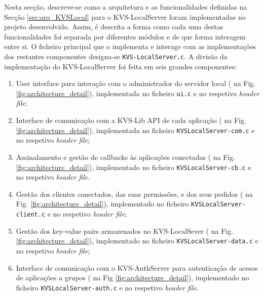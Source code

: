 Nesta secção, descreve-se como a arquitetura e as funcionalidades definidas na Secção \ref{sec:arq_KVSLocal} para o KVS-LocalServer foram implementadas no projeto desenvolvido. Assim, é descrita a forma como cada uma destas funcionalidades foi separada por diferentes módulos e de que forma interagem entre si. O ficheiro principal que o implementa e interage com as implementações dos restantes componentes designa-se \texttt{KVS-LocalServer.c}. A divisão da implementação do KVS-LocalServer foi feita em seis grandes componentes:
\begin{enumerate}[noitemsep]
    \item User interface para interação com o administrador do servidor local ( na Fig. \ref{fig:architecture_detail}), implementada no ficheiro \texttt{ui.c} e no respetivo \textit{header file};
    \item Interface de comunicação com a KVS-Lib API de cada aplicação ( na Fig. \ref{fig:architecture_detail}), implementada no ficheiro \texttt{KVSLocalServer-com.c} e no respetivo \textit{header file};
    \item Assinalamento e gestão de callbacks às aplicações conectadas ( na Fig. \ref{fig:architecture_detail}), implementado no ficheiro \texttt{KVSLocalServer-cb.c} e no respetivo \textit{header file}.
    \item Gestão dos clientes conectados, das suas permissões, e dos seus pedidos ( na Fig. \ref{fig:architecture_detail}), implementado no ficheiro \texttt{KVSLocalServer-client.c} e no respetivo \textit{header file};
    \item Gestão dos key-value pairs armazenados no KVS-LocalSever ( na Fig. \ref{fig:architecture_detail}), implementado no ficheiro \texttt{KVSLocalServer-data.c} e no respetivo \textit{header file};
    \item Interface de comunicação com o KVS-AuthServer para autenticação de acesos de aplicações a grupos  ( na Fig \ref{fig:architecture_detail}), implementado no ficheiro \texttt{KVSLocalServer-auth.c} e no respetivo \textit{header file}.
\end{enumerate}

